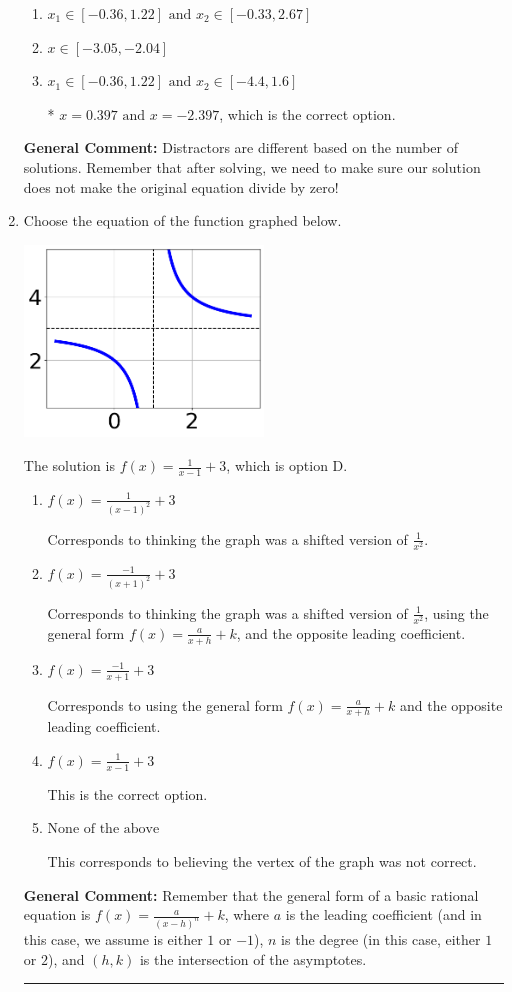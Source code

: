 \documentclass{extbook}[14pt]
\newcommand{\litem}[1]{\item #1

\rule{\textwidth}{0.4pt}}
\begin{document}
\begin{enumerate}
{\begin{enumerate}[label=\Alph*.]
\item \( x_1 \in [-0.36, 1.22] \text{ and } x_2 \in [-0.33,2.67] \)


\item \( x \in [-3.05,-2.04] \)


\item \( x_1 \in [-0.36, 1.22] \text{ and } x_2 \in [-4.4,1.6] \)

* $x = 0.397 \text{ and } x = -2.397$, which is the correct option.
\end{enumerate}

\textbf{General Comment:} Distractors are different based on the number of solutions. Remember that after solving, we need to make sure our solution does not make the original equation divide by zero!
}
\litem{
Choose the equation of the function graphed below.

\begin{center}
    \includegraphics[width=0.5\textwidth]{../Figures/rationalGraphToEquationA.png}
\end{center}


The solution is \( f(x) = \frac{1}{x - 1} + 3 \), which is option D.\begin{enumerate}[label=\Alph*.]
\item \( f(x) = \frac{1}{(x - 1)^2} + 3 \)

Corresponds to thinking the graph was a shifted version of $\frac{1}{x^2}$.
\item \( f(x) = \frac{-1}{(x + 1)^2} + 3 \)

Corresponds to thinking the graph was a shifted version of $\frac{1}{x^2}$, using the general form $f(x) = \frac{a}{x+h}+k$, and the opposite leading coefficient.
\item \( f(x) = \frac{-1}{x + 1} + 3 \)

Corresponds to using the general form $f(x) = \frac{a}{x+h}+k$ and the opposite leading coefficient.
\item \( f(x) = \frac{1}{x - 1} + 3 \)

This is the correct option.
\item \( \text{None of the above} \)

This corresponds to believing the vertex of the graph was not correct.
\end{enumerate}

\textbf{General Comment:} Remember that the general form of a basic rational equation is $ f(x) = \frac{a}{(x-h)^n} + k$, where $a$ is the leading coefficient (and in this case, we assume is either $1$ or $-1$), $n$ is the degree (in this case, either $1$ or $2$), and $(h, k)$ is the intersection of the asymptotes.
}
\end{enumerate}
\end{document}
